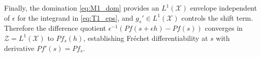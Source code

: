 \documentclass[12pt,leqno]{amsart}
\begin{document}
Finally, the domination \eqref{eq:M1_dom} provides an $L^1(\mathcal{X})$ envelope independent of $\epsilon$ for the integrand
in \eqref{eq:T1_eps}, and $g_s'\in L^1(\mathcal{X})$ controls the shift term. Therefore the difference quotient
$\epsilon^{-1}(Pf(s+\epsilon h)-Pf(s))$ converges in $\mathcal{Z}=L^1(\mathcal{X})$ to $Pf_s(h)$, establishing
Fr\'echet differentiability at $s$ with derivative $Pf'(s)=Pf_s$.

\end{document}
